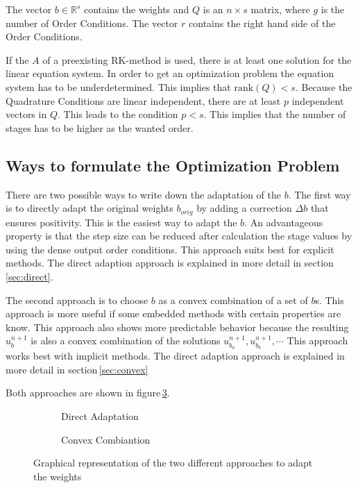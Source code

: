 \documentclass{article}
\begin{document}
The vector $b \in \mathbb{R}^s$ contains the weights and $Q$ is an $n \times s$ matrix, where $g$ is the number of Order Conditions. The vector $r$ contains the right hand side of the Order Conditions.

If the $A$ of a  preexisting RK-method is used, there is at least one solution for the linear equation system.
In order to get an optimization problem the equation system has to be underdetermined.
This implies that $\mathrm{rank}(Q) < s$. 
Because the Quadrature Conditions are linear independent, there are at least $p$ independent vectors in $Q$. This leads to the condition $p < s$.
This implies that the number of stages has to be higher as the wanted order.


\subsection{Ways to formulate the Optimization Problem}

There are two possible ways to write down the adaptation of the $b$. The first way is to directly adapt the original weights $b_{orig}$ by adding a correction $\Delta b$ that ensures positivity.
This is the easiest way to adapt the $b$. An advantageous property is that the step size can be reduced after calculation the stage values by using the dense output order conditions.  
This approach suits best for explicit methods.
The direct adaption approach is explained in more detail in section\,\ref{sec:direct}.

The second approach is to choose $b$ as a convex combination of a set of $b$s. This approach is more useful if some embedded methods with certain properties are know. 
This approach also shows more  predictable behavior because the resulting $u^{n+1}_b$ is also a convex combination of the solutions $u^{n+1}_{b_a},u^{n+1}_{b_b},\cdots$ 
This approach works best with implicit methods.
The direct adaption approach is explained in more detail in section\,\ref{sec:convex}

Both approaches are shown in figure\,\ref{fig:b_space}.


\begin{figure}
    \centering
    \begin{subfigure}[b]{0.45\textwidth}
        
        \caption{Direct Adaptation}
        \label{fig:b_direct}
    \end{subfigure}
    \begin{subfigure}[b]{0.45\textwidth}
        
        \caption{Convex Combiantion}
        \label{fig:b_convex}
    \end{subfigure}
    \caption{Graphical representation of the two different approaches to adapt the weights}\label{fig:b_space}
\end{figure}
\end{document}
